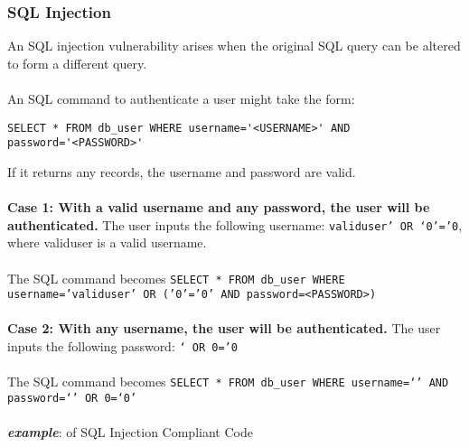 \documentclass[a4paper]{article}
\begin{document}
\subsubsection{SQL Injection}
An SQL injection vulnerability arises when the original SQL query can be altered to form a different query.\\
\\
An SQL command to authenticate a user might take the form:
\begin{verbatim}
SELECT * FROM db_user WHERE username='<USERNAME>' AND
password='<PASSWORD>'
\end{verbatim}
If it returns any records, the username and password are valid.\\
\\
\textbf{Case 1: With a valid username and any password, the user will be authenticated.} The user inputs the following username: \texttt{validuser' OR `0'='0}, where validuser is a valid username.\\
\\
The SQL command becomes \texttt{SELECT * FROM db\_user WHERE username='validuser' OR ('0'='0' AND password=<PASSWORD>)}\\
\\
\textbf{Case 2: With any username, the user will be authenticated.} The user inputs the following password: \texttt{` OR 0='0}\\
\\
The SQL command becomes \texttt{SELECT * FROM db\_user WHERE username=`' AND password=`' OR 0=`0'}\\
\\
\newpage
\noindent \textbf{\textit{example}}: of SQL Injection Compliant Code
\end{document}
